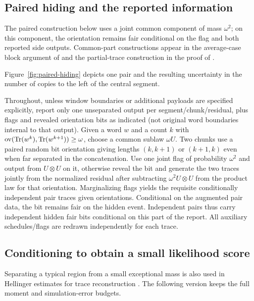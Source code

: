 \subsection{Paired hiding and the reported information}
The paired construction below uses a joint common component of mass $\omega^2$; on this component, the orientation remains fair conditional on the flag and both reported side outputs.  Common-part constructions appear in the average-case block argument of \citet[Section 3.3]{MPV2014} and the partial-trace construction in the proof of \citet[Lemma 2.1]{HoldenLyons2020}.

Figure~\ref{fig:paired-hiding} depicts one pair and the resulting uncertainty in the number of copies to the left of the central segment.


Throughout, unless window boundaries or additional payloads are
specified explicitly, report only one unseparated output
per segment/chunk/residual, plus flags and revealed orientation bits
as indicated (not original word boundaries internal to that output).
Given a word $w$ and a count $k$ with $\operatorname{ov}(\mathrm{Tr}(w^k),\mathrm{Tr}(w^{k+1}))\ge\omega$, choose a common sublaw $\omega U$.  Two chunks use a paired random bit orientation giving lengths
$(k,k+1)$ or $(k+1,k)$ even when far separated in the concatenation.
Use one joint flag of probability $\omega^2$ and output from
$U\otimes U$ on it, otherwise reveal the bit and generate the
two traces jointly from the normalized residual after subtracting
$\omega^2 U\otimes U$ from the product law for that orientation.
Marginalizing flags yields the requisite conditionally independent
pair traces given orientations. Conditional on the augmented
pair data, the bit remains fair on the hidden event. Independent
pairs thus carry independent hidden fair bits conditional on this
part of the report. All auxiliary schedules/flags are redrawn
independently for each trace.

\newpage
\subsection{Conditioning to obtain a small likelihood score}
Separating a typical region from a small exceptional mass is also used in Hellinger estimates for trace reconstruction \citep[arXiv v2, Section 2]{Chase2021Lower}.  The following version keeps the full moment and simulation-error budgets.

